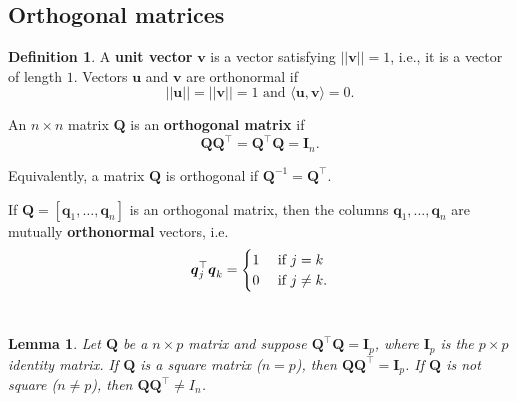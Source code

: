 \documentclass[]{book}
\newtheorem{lemma}{Lemma}[chapter]
\theoremstyle{definition}
\newtheorem{definition}{Definition}[chapter]
\theoremstyle{definition}
\theoremstyle{definition}
\theoremstyle{remark}
\begin{document}
\hypertarget{orthogonal-matrices}{%
\subsection{Orthogonal matrices}\label{orthogonal-matrices}}

\begin{definition}
\protect\hypertarget{def:orthogonal}{}{\label{def:orthogonal} }A \textbf{unit vector} \(\mathbf v\) is a vector satisfying \(||{\mathbf v}||=1\), i.e., it is a vector of length \(1\). Vectors \(\boldsymbol u\) and \(\boldsymbol v\) are orthonormal if
\[||\boldsymbol u||=||\boldsymbol v|| = 1 \mbox{ and } \langle \boldsymbol u, \boldsymbol v\rangle =0.\]

An \(n\times n\) matrix \({\mathbf Q}\) is an \textbf{orthogonal matrix} if \[{\mathbf Q}\boldsymbol Q^\top = {\mathbf Q}^\top {\mathbf Q}={\mathbf I}_n.\]

Equivalently, a matrix \(\mathbf Q\) is orthogonal if \({\mathbf Q}^{-1}={\mathbf Q}^\top.\)

If \({\mathbf Q}=[\boldsymbol q_1,\ldots, \boldsymbol q_n]\) is an orthogonal matrix, then the columns \(\boldsymbol q_1, \ldots, \boldsymbol q_n\) are mutually \textbf{orthonormal} vectors, i.e.
\[
\boldsymbol q_j^\top \boldsymbol q_k=\begin{cases} 1 &\hbox{ if }  j=k\\
0 &\hbox{ if }   j \neq k. \\
\end{cases}
\]\\
\end{definition}

\begin{lemma}
\protect\hypertarget{lem:lemorthog}{}{\label{lem:lemorthog} }Let \(\boldsymbol Q\) be a \(n\times p\) matrix and suppose \(\boldsymbol Q^\top \boldsymbol Q=\mathbf I_p\), where \(\mathbf I_p\) is the \(p \times p\) identity matrix. If \(\boldsymbol Q\) is a square matrix (\(n=p\)), then \(\boldsymbol Q\boldsymbol Q^\top = \mathbf I_p\). If \(\boldsymbol Q\) is not square (\(n\not =p\)), then \(\boldsymbol Q\boldsymbol Q^\top \not = I_n\).
\end{lemma}
\end{document}
